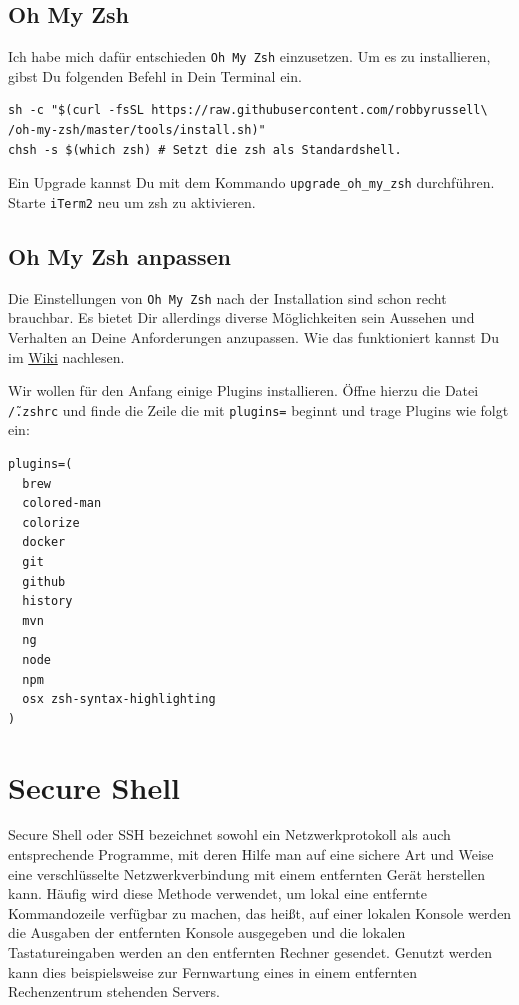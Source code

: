 \documentclass[]{article}
\newcommand{\code}[1]{\texttt{#1}}
\begin{document}
\subsection{Oh My Zsh}
Ich habe mich dafür entschieden \code{Oh My Zsh} einzusetzen. Um es zu installieren, gibst Du folgenden Befehl in Dein Terminal ein.
\begin{verbatim}
sh -c "$(curl -fsSL https://raw.githubusercontent.com/robbyrussell\
/oh-my-zsh/master/tools/install.sh)"
chsh -s $(which zsh) # Setzt die zsh als Standardshell.
\end{verbatim}

Ein Upgrade kannst Du mit dem Kommando \code{upgrade\_oh\_my\_zsh} durchführen. Starte \code{iTerm2} neu um zsh zu aktivieren.

\subsection{Oh My Zsh anpassen}
Die Einstellungen von \code{Oh My Zsh} nach der Installation sind schon recht brauchbar. Es bietet Dir allerdings diverse Möglichkeiten sein Aussehen und Verhalten an Deine Anforderungen anzupassen. Wie das funktioniert kannst Du im \href{https://github.com/robbyrussell/oh-my-zsh/wiki}{Wiki} nachlesen.

Wir wollen für den Anfang einige Plugins installieren. Öffne hierzu die Datei \code{\~/.zshrc} und finde die Zeile die mit \code{plugins=} beginnt und trage Plugins wie folgt ein:
\begin{verbatim}
plugins=(
  brew 
  colored-man 
  colorize  
  docker 
  git 
  github 
  history 
  mvn 
  ng 
  node 
  npm 
  osx zsh-syntax-highlighting
)
\end{verbatim}

\section{Secure Shell}
Secure Shell oder SSH bezeichnet sowohl ein Netzwerkprotokoll als auch entsprechende Programme, mit deren Hilfe man auf eine sichere Art und Weise eine verschlüsselte Netzwerkverbindung mit einem entfernten Gerät herstellen kann. Häufig wird diese Methode verwendet, um lokal eine entfernte Kommandozeile verfügbar zu machen, das heißt, auf einer lokalen Konsole werden die Ausgaben der entfernten Konsole ausgegeben und die lokalen Tastatureingaben werden an den entfernten Rechner gesendet. Genutzt werden kann dies beispielsweise zur Fernwartung eines in einem entfernten Rechenzentrum stehenden Servers.\cite{wikipediaSecureShell}
\end{document}
